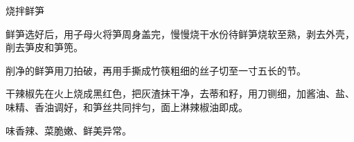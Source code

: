 \begin{recipe}{烧拌鲜笋}

\ingredients


\preparation

\step 鲜笋选好后，用子母火将笋周身盖完，慢慢烧干水份待鲜笋烧软至熟，剥去外壳，
削去笋皮和笋篼。

\step 削净的鲜笋用刀拍破，再用手撕成竹筷粗细的丝子切至一寸五长的节。

\step 干辣椒先在火上烧成黑红色，把灰渣抹干净，去蒂和籽，用刀铡细，加酱油、盐、
味精、香油调好，和笋丝共同拌匀，面上淋辣椒油即成。

\features

味香辣、菜脆嫩、鲜美异常。

\end{recipe}

